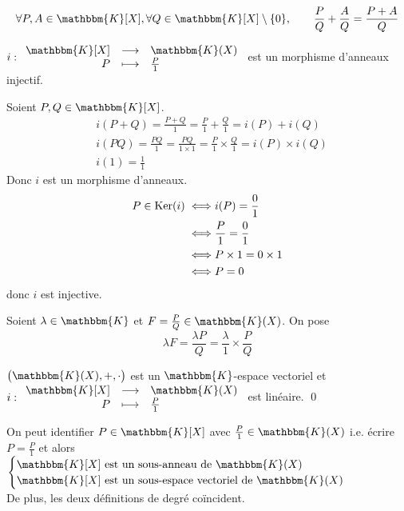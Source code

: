 \begin{prop}
	\[
		\forall P,A \in \mathbbm{K}[X], \forall Q \in \mathbbm{K}[X]\setminus \{0\}, \qquad
		\frac{P}{Q}+\frac{A}{Q} = \frac{P+A}{Q}
	\]
\end{prop}

\begin{prop}
	$i : \begin{array}{rcl}
		\mathbbm{K}[X] &\longrightarrow& \mathbbm{K}(X) \\
		P &\longmapsto& \frac{P}{1}\\
	\end{array}$ est un morphisme d'anneaux injectif.
\end{prop}

\begin{prv}
	Soient $P, Q \in \mathbbm{K}[X]$.
	\begin{align*}
		&i(P + Q) = \frac{P+Q}{1} = \frac{P}{1} + \frac{Q}{1} = i(P) + i(Q)\\
		&i(PQ) = \frac{PQ}{1}  = \frac{PQ}{1\times 1} = \frac{P}{1} \times \frac{Q}{1} = i(P) \times i(Q)\\
		&i(1) = \frac{1}{1}
	\end{align*}
	Donc $i$ est un morphisme d'anneaux.
	\begin{align*}
		P \in \operatorname{Ker}(i) \iff& i(P) = \frac{0}{1}\\
		\iff& \frac{P}{1} = \frac{0}{1}\\
		\iff& P\times 1 = 0\times 1\\
		\iff& P = 0
	\end{align*} donc $i$ est injective.
\end{prv}

\begin{defn}
	Soient $\lambda \in \mathbbm{K}$ et $F = \frac{P}{Q} \in \mathbbm{K}(X)$. On pose \[
		\lambda F = \frac{\lambda P}{Q} = \frac{\lambda}{1} \times  \frac{P}{Q}
	\]
\end{defn}

\begin{prop}
	$\big(\mathbbm{K}(X), +, \cdot\big)$ est un $\mathbbm{K}$-espace vectoriel et $i : \begin{array}{rcl}
		\mathbbm{K}[X] &\longrightarrow& \mathbbm{K}(X) \\
		P &\longmapsto& \frac{P}{1}
	\end{array}$ est linéaire. \qed
\end{prop}

\begin{rmk}
	On peut identifier $P \in \mathbbm{K}[X]$ avec $\frac{P}{1} \in \mathbbm{K}(X)$ i.e. écrire $P = \frac{P}{1}$ et alors $\begin{cases}
		\mathbbm{K}[X]\text{ est un sous-anneau de } \mathbbm{K}(X)\\
		\mathbbm{K}[X]\text{ est un sous-espace vectoriel de } \mathbbm{K}(X)
	\end{cases}$ \\
	De plus, les deux définitions de degré coïncident.
\end{rmk}

